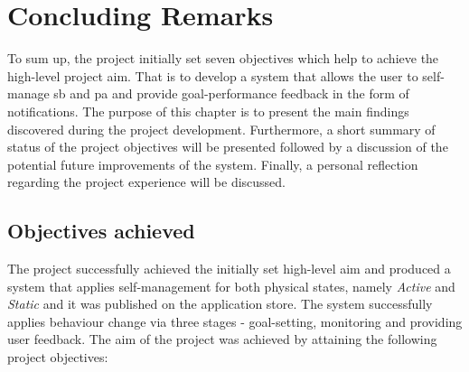 \chapter{Concluding Remarks}
\label{chapter:conclusion}
To sum up, the project initially set seven objectives which help to achieve the high-level project aim. That is to develop a system that allows the user to self-manage \gls{sb} and \gls{pa} and provide goal-performance feedback in the form of notifications. The purpose of this chapter is to present the main findings discovered during the project development. Furthermore, a short summary of status of the project objectives will be presented followed by a discussion of the potential future improvements of the system. Finally, a personal reflection regarding the project experience will be discussed. 

\section{Objectives achieved}
The project successfully achieved the initially set high-level aim and produced a system that applies self-management for both physical states, namely \textit{Active} and \textit{Static} and it was published on the application store. The system successfully applies behaviour change via three stages - goal-setting, monitoring and providing user feedback. The aim of the project was achieved by attaining the following project objectives:

